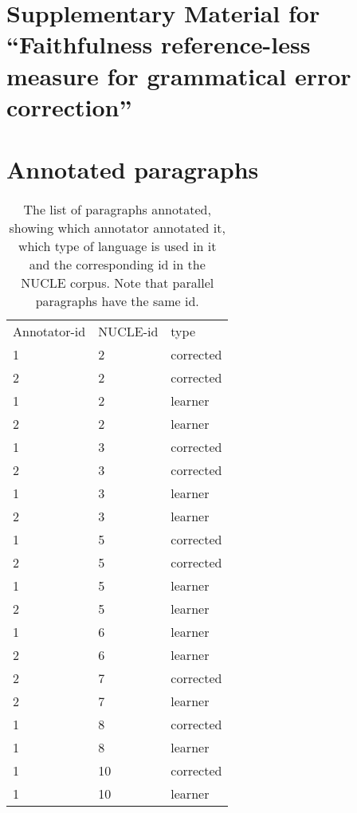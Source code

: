 \documentclass[a4paper, 11pt]{article}
\begin{document}
\appendix

\title{}

\onecolumn
\section*{\centering\Large Supplementary Material for ``Faithfulness reference-less measure for grammatical error correction''}
\section{Annotated paragraphs}
	\begin{table}[hb]
		\centering
		\begin{tabular}{lll}
			Annotator-id & NUCLE-id & type      \\
			1         & 2  & corrected \\
			2         & 2  & corrected \\
			1         & 2  & learner   \\
			2         & 2  & learner   \\
			1         & 3  & corrected \\
			2         & 3  & corrected \\
			1         & 3  & learner   \\
			2         & 3  & learner   \\
			1         & 5  & corrected \\
			2         & 5  & corrected \\
			1         & 5  & learner   \\
			2         & 5  & learner   \\
			1         & 6  & learner   \\
			2         & 6  & learner   \\
			2         & 7  & corrected \\
			2         & 7  & learner   \\
			1         & 8  & corrected \\
			1         & 8  & learner   \\
			1         & 10 & corrected \\
			1         & 10 & learner  
		\end{tabular}
		\caption{The list of paragraphs annotated, showing which annotator annotated it, which type of language is used in it and the corresponding id in the NUCLE corpus. Note that parallel paragraphs have the same id.\label{tab:annotated-paragraphs}}
	\end{table}
\end{document}
